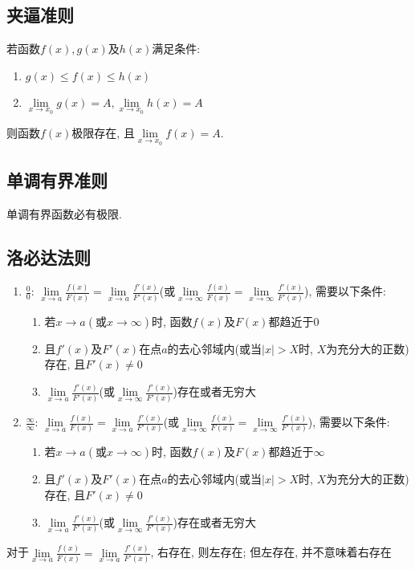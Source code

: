 \subsection{夹逼准则}\label{夹逼定理}
若函数$ f(x), g(x) $及$ h(x) $满足条件:
\begin{enumerate}
\item $ g(x)\le f(x)\le h(x) $
\item $ \lim\limits_{x\rightarrow x_{0}}g(x)=A, \lim\limits_{x\rightarrow x_{0}}h(x)=A $
\end{enumerate}\par
则函数$ f(x) $极限存在, 且$ \lim\limits_{x\rightarrow x_{0}}f(x)=A $.
\subsection{单调有界准则}
单调有界函数必有极限.
\subsection{洛必达法则}\label{洛必达法则}
\begin{enumerate}
\item $ \frac{0}{0} $: $ \lim\limits_{x\rightarrow a}\frac{f(x)}{F(x)}=\lim\limits_{x\rightarrow a}\frac{f'(x)}{F'(x)} $(或$ \lim\limits_{x\rightarrow \infty}\frac{f(x)}{F(x)}=\lim\limits_{x\rightarrow \infty}\frac{f'(x)}{F'(x)} $), 需要以下条件:
\begin{enumerate}
\item 若$ x\rightarrow a(\text{或}x\rightarrow \infty) $时, 函数$ f(x) $及$ F(x) $都趋近于$ 0 $
\item 且$ f'(x) $及$ F'(x) $在点$ a $的去心邻域内(或当$ |x|>X $时, $ X $为充分大的正数)存在, 且$ F'(x)\neq 0 $
\item $ \lim\limits_{x\rightarrow a}\frac{f'(x)}{F'(x)} $(或$ \lim\limits_{x\rightarrow \infty}\frac{f'(x)}{F'(x)} $)存在或者无穷大
\end{enumerate}
\item $ \frac{\infty}{\infty} $: $ \lim\limits_{x\rightarrow a}\frac{f(x)}{F(x)}=\lim\limits_{x\rightarrow a}\frac{f'(x)}{F'(x)} $(或$ \lim\limits_{x\rightarrow \infty}\frac{f(x)}{F(x)}=\lim\limits_{x\rightarrow \infty}\frac{f'(x)}{F'(x)} $), 需要以下条件:
\begin{enumerate}
\item 若$ x\rightarrow a(\text{或}x\rightarrow \infty) $时, 函数$ f(x) $及$ F(x) $都趋近于$ \infty $
\item 且$ f'(x) $及$ F'(x) $在点$ a $的去心邻域内(或当$ |x|>X $时, $ X $为充分大的正数)存在, 且$ F'(x)\neq 0 $
\item $ \lim\limits_{x\rightarrow a}\frac{f'(x)}{F'(x)} $(或$ \lim\limits_{x\rightarrow \infty}\frac{f'(x)}{F'(x)} $)存在或者无穷大
\end{enumerate}
\end{enumerate}
\begin{tcolorbox}
对于$ \lim\limits_{x\rightarrow a}\frac{f(x)}{F(x)}=\lim\limits_{x\rightarrow a}\frac{f'(x)}{F'(x)} $, 右存在, 则左存在; 但左存在, 并不意味着右存在
\end{tcolorbox}
